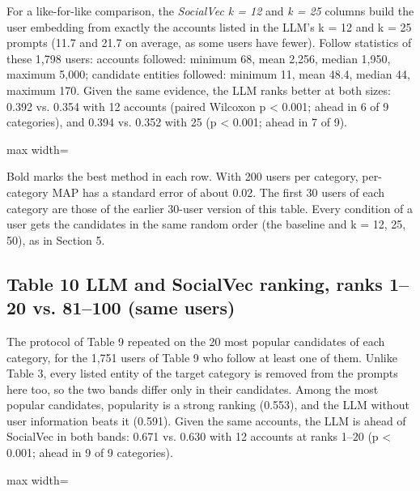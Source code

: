 \documentclass[10pt]{article}
\begin{document}
For a like-for-like comparison, the \emph{SocialVec k = 12} and \emph{k = 25} columns build the user embedding from exactly the accounts listed in the LLM's k = 12 and k = 25 prompts (11.7 and 21.7 on average, as some users have fewer). Follow statistics of these 1,798 users: accounts followed: minimum 68, mean 2,256, median 1,950, maximum 5,000; candidate entities followed: minimum 11, mean 48.4, median 44, maximum 170. Given the same evidence, the LLM ranks better at both sizes: 0.392 vs. 0.354 with 12 accounts (paired Wilcoxon p \textless{} 0.001; ahead in 6 of 9 categories), and 0.394 vs. 0.352 with 25 (p \textless{} 0.001; ahead in 7 of 9).

\begin{center}\begin{adjustbox}{max width=\linewidth}

\end{adjustbox}\end{center}

{\small Bold marks the best method in each row. With 200 users per category, per-category MAP has a standard error of about 0.02. The first 30 users of each category are those of the earlier 30-user version of this table. Every condition of a user gets the candidates in the same random order (the baseline and k = 12, 25, 50), as in Section 5.}

\subsection*{Table 10 \textperiodcentered{} LLM and SocialVec ranking, ranks 1--20 vs. 81--100 (same users)}
The protocol of Table 9 repeated on the 20 most popular candidates of each category, for the 1,751 users of Table 9 who follow at least one of them. Unlike Table 3, every listed entity of the target category is removed from the prompts here too, so the two bands differ only in their candidates. Among the most popular candidates, popularity is a strong ranking (0.553), and the LLM without user information beats it (0.591). Given the same accounts, the LLM is ahead of SocialVec in both bands: 0.671 vs. 0.630 with 12 accounts at ranks 1--20 (p \textless{} 0.001; ahead in 9 of 9 categories).

\begin{center}\begin{adjustbox}{max width=\linewidth}

\end{adjustbox}\end{center}
\end{document}

